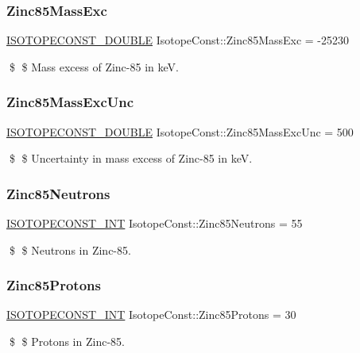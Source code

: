 \subsubsection{\texorpdfstring{Zinc85\+Mass\+Exc}{Zinc85MassExc}}
{\footnotesize\ttfamily \mbox{\hyperlink{group___isotope_const-_macros_ga8f45a7272ce02c0b4c65c44636ed719a}{I\+S\+O\+T\+O\+P\+E\+C\+O\+N\+S\+T\+\_\+\+D\+O\+U\+B\+LE}} Isotope\+Const\+::\+Zinc85\+Mass\+Exc = -\/25230}

\$ \$ Mass excess of Zinc-\/85 in keV. \mbox{\label{group___isotope_const-_zinc-_zn85_gaecd89d469ffb3865ca6d85c210e4bb84}} 
\subsubsection{\texorpdfstring{Zinc85\+Mass\+Exc\+Unc}{Zinc85MassExcUnc}}
{\footnotesize\ttfamily \mbox{\hyperlink{group___isotope_const-_macros_ga8f45a7272ce02c0b4c65c44636ed719a}{I\+S\+O\+T\+O\+P\+E\+C\+O\+N\+S\+T\+\_\+\+D\+O\+U\+B\+LE}} Isotope\+Const\+::\+Zinc85\+Mass\+Exc\+Unc = 500}

\$ \$ Uncertainty in mass excess of Zinc-\/85 in keV. \mbox{\label{group___isotope_const-_zinc-_zn85_ga466e8ff622716ba4d68dd2d5fae9ed40}} 
\subsubsection{\texorpdfstring{Zinc85\+Neutrons}{Zinc85Neutrons}}
{\footnotesize\ttfamily \mbox{\hyperlink{group___isotope_const-_macros_ga5f18360b3e99483a35c32d789e62621c}{I\+S\+O\+T\+O\+P\+E\+C\+O\+N\+S\+T\+\_\+\+I\+NT}} Isotope\+Const\+::\+Zinc85\+Neutrons = 55}

\$ \$ Neutrons in Zinc-\/85. \mbox{\label{group___isotope_const-_zinc-_zn85_ga83e99de99bedd4247d69a89f920544bf}} 
\subsubsection{\texorpdfstring{Zinc85\+Protons}{Zinc85Protons}}
{\footnotesize\ttfamily \mbox{\hyperlink{group___isotope_const-_macros_ga5f18360b3e99483a35c32d789e62621c}{I\+S\+O\+T\+O\+P\+E\+C\+O\+N\+S\+T\+\_\+\+I\+NT}} Isotope\+Const\+::\+Zinc85\+Protons = 30}

\$ \$ Protons in Zinc-\/85. 